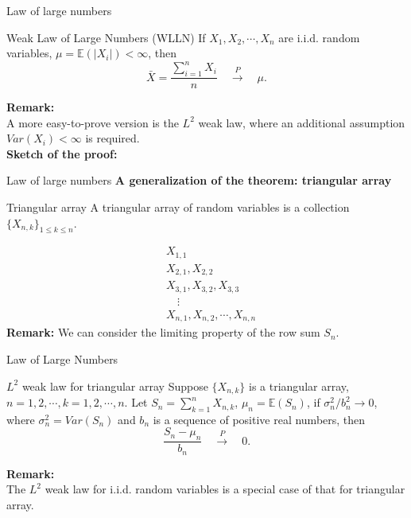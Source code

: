 \documentclass [aspectratio=169]{beamer}
\begin{document}
\begin{frame}{Law of large numbers}
    \begin{block}{Weak Law of Large Numbers (WLLN)}
    If $X_1, X_2, \cdots, X_n$ are i.i.d. random variables, $\mu = \mathbb{E}(|X_i|) < \infty$, then
    $$\bar{X} = \frac{\sum_{i = 1}^n X_i}{n} \quad \xrightarrow[]{P} \quad \mu.$$
    \end{block}
    \vspace{0.1in}
    \textbf{Remark:}\\
    A more easy-to-prove version is the $L^2$ weak law, where an additional assumption $Var(X_i) < \infty$ is required.\\
    \vspace{0.1in}
    \textbf{Sketch of the proof:}\\
    \vspace{0.8in}
\end{frame}

\begin{frame}{Law of large numbers}
\textbf{A generalization of the theorem: triangular array}
\begin{block}{Triangular array}
A triangular array of random variables is a collection $\{X_{n,k}\}_{1 \le k \le n}$. 
\end{block}
\begin{equation*}
    \begin{aligned}
    & X_{1,1} \\
    & X_{2,1}, X_{2,2}\\
    & X_{3,1}, X_{3,2}, X_{3,3}\\
    & \quad \vdots \\
    & X_{n, 1}, X_{n,2}, \cdots, X_{n,n}
    \end{aligned}
\end{equation*}
\vspace{0.1in}
\textbf{Remark:} We can consider the limiting property of the row sum $S_n$.
\end{frame}

\begin{frame}{Law of Large Numbers}
     \begin{block}{$L^2$ weak law for triangular array}
    Suppose $\{X_{n,k}\}$ is a triangular array, $n = 1, 2, \cdots, k =1, 2, \cdots, n$. Let $S_n = \sum_{k = 1}^n X_{n,k}$, $\mu_n = \mathbb{E}(S_n)$, if $\sigma_n^2/b_n^2 \to 0$, where $\sigma_n^2 = Var(S_n)$ and $b_n$ is a sequence of positive real numbers, then
    $$ \frac{S_n - \mu_n}{b_n} \quad \xrightarrow[]{P} \quad 0.$$
    \end{block}
    \vspace{0.1in}
    \textbf{Remark:}\\
    The $L^2$ weak law for i.i.d. random variables is a special case of that for triangular array.
    \vspace{0.7in}
\end{frame}
\end{document}
